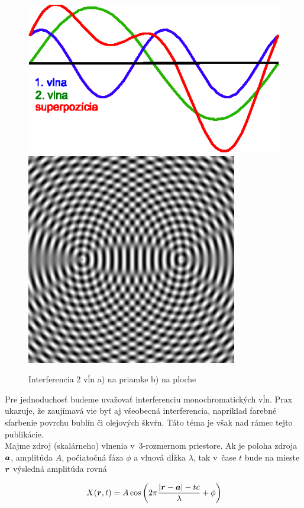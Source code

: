  \begin{figure}[htp]
 \centering
 \includegraphics{obrazky/fyzika/optika/interferencia_1}
 \includegraphics{obrazky/fyzika/optika/interferencia_2}

 \caption{Interferencia 2 vĺn a) na priamke b) na ploche}
 \label{fig:interferencia}
 \end{figure}

Pre jednoduchosť budeme uvažovať interferenciu monochromatických vĺn.
Prax ukazuje, že zaujímavá vie byť aj všeobecná interferencia,
napríklad farebné sfarbenie povrchu bublín či olejových škvŕn. 
Táto téma je však nad rámec tejto publikácie.
\\

Majme zdroj (skalárneho) vlnenia v~3-rozmernom priestore.
Ak je poloha zdroja $\boldsymbol{a}$, amplitúda $A$, počiatočná fáza $\phi$ a vlnová dĺžka
$\lambda$, tak v~čase $t$ bude na mieste $\boldsymbol{r}$ výsledná amplitúda rovná

\begin{equation}
X(\boldsymbol{r},t)=A \cos \left(2 \pi \frac{|\boldsymbol{r}-\boldsymbol{a}| - t
c}{\lambda}+\phi \right)
\end{equation}


